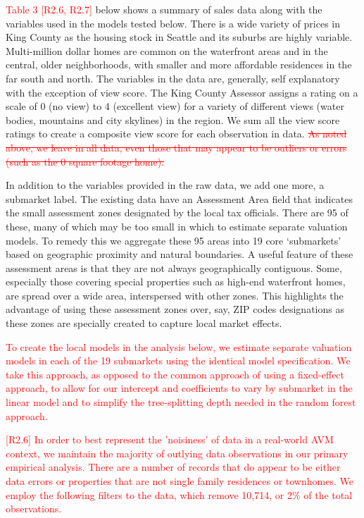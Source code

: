 \documentclass[colTwo]{anon}
\theoremstyle{definition}
\begin{document}
\textcolor{red}{Table 3 [R2.6, R2.7]} below shows a summary of sales data along with the variables used in the models tested below. There is a wide variety of prices in King County as the housing stock in Seattle and its suburbs are highly variable.  Multi-million dollar homes are common on the waterfront areas and in the central, older neighborhoods, with smaller and more affordable residences in the far south and north.  The variables in the data are, generally, self explanatory with the exception of view score. The King County Assessor assigns a rating on a scale of 0 (no view) to 4 (excellent view) for a variety of different views (water bodies, mountains and city skylines) in the region. We sum all the view score ratings to create a composite view score for each observation in data.  \textcolor{red}{\st{As noted above, we leave in all data, even those that may appear to be outliers or errors (such as the 0 square footage home).}} 

In addition to the variables provided in the raw data, we add one more, a submarket label.  The existing data have an Assessment Area field that indicates the small assessment zones designated by the local tax officials.  There are 95 of these, many of which may be too small in which to estimate separate valuation models.  To remedy this we aggregate these 95 areas into 19 core ‘submarkets’ based on geographic proximity and natural boundaries. A useful feature of these assessment areas is that they are not always geographically contiguous.  Some, especially those covering special properties such as high-end waterfront homes, are spread over a wide area, interspersed with other zones.  This highlights the advantage of using these assessment zones over, say, ZIP codes designations as these zones are specially created to capture local market effects.

\textcolor{red}{To create the local models in the analysis below, we estimate separate valuation models in each of the 19 submarkets using the identical model specification.  We take this approach, as opposed to the common approach of using a fixed-effect approach, to allow for our intercept and coefficients to vary by submarket in the linear model and to simplify the tree-splitting depth needed in the random forest approach.} 

\textcolor{red}{
[R2.6] In order to best represent the 'noisiness' of data in a real-world AVM context, we maintain the majority of outlying data observations in our primary empirical analysis. There are a number of records that do appear to be either data errors or properties that are not single family residences or townhomes.  We employ the following filters to the data, which remove 10,714, or 2\% of the total observations.}
\end{document}
